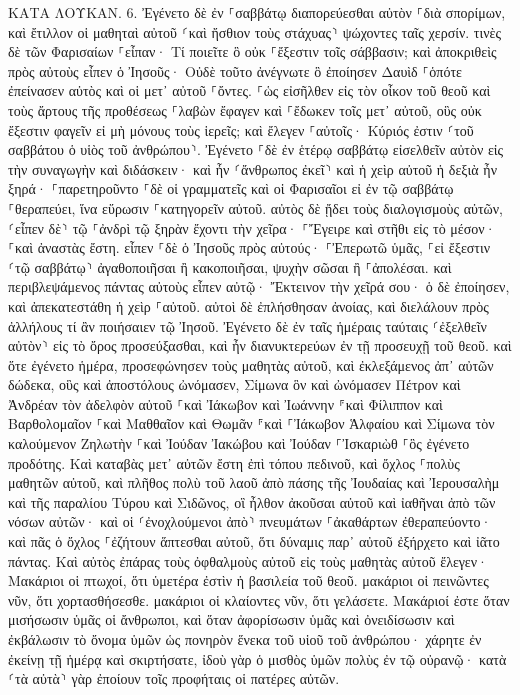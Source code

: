 \documentclass[twoside, 9pt]{extreport}
\begin{document}
ΚΑΤΑ ΛΟΥΚΑΝ.
6.
Ἐγένετο δὲ ἐν ⸀σαββάτῳ διαπορεύεσθαι αὐτὸν ⸀διὰ σπορίμων, καὶ ἔτιλλον οἱ μαθηταὶ αὐτοῦ ⸂καὶ ἤσθιον τοὺς στάχυας⸃ ψώχοντες ταῖς χερσίν. 
τινὲς δὲ τῶν Φαρισαίων ⸀εἶπαν· Τί ποιεῖτε ὃ οὐκ ⸀ἔξεστιν τοῖς σάββασιν; 
καὶ ἀποκριθεὶς πρὸς αὐτοὺς εἶπεν ὁ Ἰησοῦς· Οὐδὲ τοῦτο ἀνέγνωτε ὃ ἐποίησεν Δαυὶδ ⸀ὁπότε ἐπείνασεν αὐτὸς καὶ οἱ μετ᾽ αὐτοῦ ⸀ὄντες. 
⸀ὡς εἰσῆλθεν εἰς τὸν οἶκον τοῦ θεοῦ καὶ τοὺς ἄρτους τῆς προθέσεως ⸀λαβὼν ἔφαγεν καὶ ⸀ἔδωκεν τοῖς μετ᾽ αὐτοῦ, οὓς οὐκ ἔξεστιν φαγεῖν εἰ μὴ μόνους τοὺς ἱερεῖς; 
καὶ ἔλεγεν ⸀αὐτοῖς· Κύριός ἐστιν ⸂τοῦ σαββάτου ὁ υἱὸς τοῦ ἀνθρώπου⸃. 
Ἐγένετο ⸀δὲ ἐν ἑτέρῳ σαββάτῳ εἰσελθεῖν αὐτὸν εἰς τὴν συναγωγὴν καὶ διδάσκειν· καὶ ἦν ⸂ἄνθρωπος ἐκεῖ⸃ καὶ ἡ χεὶρ αὐτοῦ ἡ δεξιὰ ἦν ξηρά· 
⸀παρετηροῦντο ⸀δὲ οἱ γραμματεῖς καὶ οἱ Φαρισαῖοι εἰ ἐν τῷ σαββάτῳ ⸀θεραπεύει, ἵνα εὕρωσιν ⸀κατηγορεῖν αὐτοῦ. 
αὐτὸς δὲ ᾔδει τοὺς διαλογισμοὺς αὐτῶν, ⸂εἶπεν δὲ⸃ τῷ ⸀ἀνδρὶ τῷ ξηρὰν ἔχοντι τὴν χεῖρα· ⸀Ἔγειρε καὶ στῆθι εἰς τὸ μέσον· ⸀καὶ ἀναστὰς ἔστη. 
εἶπεν ⸀δὲ ὁ Ἰησοῦς πρὸς αὐτούς· ⸀Ἐπερωτῶ ὑμᾶς, ⸀εἰ ἔξεστιν ⸂τῷ σαββάτῳ⸃ ἀγαθοποιῆσαι ἢ κακοποιῆσαι, ψυχὴν σῶσαι ἢ ⸀ἀπολέσαι. 
καὶ περιβλεψάμενος πάντας αὐτοὺς εἶπεν αὐτῷ· Ἔκτεινον τὴν χεῖρά σου· ὁ δὲ ἐποίησεν, καὶ ἀπεκατεστάθη ἡ χεὶρ ⸀αὐτοῦ. 
αὐτοὶ δὲ ἐπλήσθησαν ἀνοίας, καὶ διελάλουν πρὸς ἀλλήλους τί ἂν ποιήσαιεν τῷ Ἰησοῦ. 
Ἐγένετο δὲ ἐν ταῖς ἡμέραις ταύταις ⸂ἐξελθεῖν αὐτὸν⸃ εἰς τὸ ὄρος προσεύξασθαι, καὶ ἦν διανυκτερεύων ἐν τῇ προσευχῇ τοῦ θεοῦ. 
καὶ ὅτε ἐγένετο ἡμέρα, προσεφώνησεν τοὺς μαθητὰς αὐτοῦ, καὶ ἐκλεξάμενος ἀπ᾽ αὐτῶν δώδεκα, οὓς καὶ ἀποστόλους ὠνόμασεν, 
Σίμωνα ὃν καὶ ὠνόμασεν Πέτρον καὶ Ἀνδρέαν τὸν ἀδελφὸν αὐτοῦ ⸀καὶ Ἰάκωβον καὶ Ἰωάννην ⸁καὶ Φίλιππον καὶ Βαρθολομαῖον 
⸀καὶ Μαθθαῖον καὶ Θωμᾶν ⸁καὶ ⸀Ἰάκωβον Ἁλφαίου καὶ Σίμωνα τὸν καλούμενον Ζηλωτὴν 
⸀καὶ Ἰούδαν Ἰακώβου καὶ Ἰούδαν ⸀Ἰσκαριὼθ ⸀ὃς ἐγένετο προδότης. 
Καὶ καταβὰς μετ᾽ αὐτῶν ἔστη ἐπὶ τόπου πεδινοῦ, καὶ ὄχλος ⸀πολὺς μαθητῶν αὐτοῦ, καὶ πλῆθος πολὺ τοῦ λαοῦ ἀπὸ πάσης τῆς Ἰουδαίας καὶ Ἰερουσαλὴμ καὶ τῆς παραλίου Τύρου καὶ Σιδῶνος, 
οἳ ἦλθον ἀκοῦσαι αὐτοῦ καὶ ἰαθῆναι ἀπὸ τῶν νόσων αὐτῶν· καὶ οἱ ⸂ἐνοχλούμενοι ἀπὸ⸃ πνευμάτων ⸀ἀκαθάρτων ἐθεραπεύοντο· 
καὶ πᾶς ὁ ὄχλος ⸀ἐζήτουν ἅπτεσθαι αὐτοῦ, ὅτι δύναμις παρ᾽ αὐτοῦ ἐξήρχετο καὶ ἰᾶτο πάντας. 
Καὶ αὐτὸς ἐπάρας τοὺς ὀφθαλμοὺς αὐτοῦ εἰς τοὺς μαθητὰς αὐτοῦ ἔλεγεν· Μακάριοι οἱ πτωχοί, ὅτι ὑμετέρα ἐστὶν ἡ βασιλεία τοῦ θεοῦ. 
μακάριοι οἱ πεινῶντες νῦν, ὅτι χορτασθήσεσθε. μακάριοι οἱ κλαίοντες νῦν, ὅτι γελάσετε. 
Μακάριοί ἐστε ὅταν μισήσωσιν ὑμᾶς οἱ ἄνθρωποι, καὶ ὅταν ἀφορίσωσιν ὑμᾶς καὶ ὀνειδίσωσιν καὶ ἐκβάλωσιν τὸ ὄνομα ὑμῶν ὡς πονηρὸν ἕνεκα τοῦ υἱοῦ τοῦ ἀνθρώπου· 
χάρητε ἐν ἐκείνῃ τῇ ἡμέρᾳ καὶ σκιρτήσατε, ἰδοὺ γὰρ ὁ μισθὸς ὑμῶν πολὺς ἐν τῷ οὐρανῷ· κατὰ ⸂τὰ αὐτὰ⸃ γὰρ ἐποίουν τοῖς προφήταις οἱ πατέρες αὐτῶν. 
\end{document}
